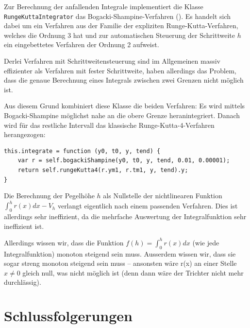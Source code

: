 \documentclass[11pt]{scrreprt} %
\theoremstyle{definition}
\begin{document}
Zur Berechnung der anfallenden Integrale implementiert die Klasse {\tt RungeKuttaIntegrator} das Bogacki-Shampine-Verfahren (\cite{wiki:bogackiShampine}). Es handelt sich dabei um ein Verfahren aus der Familie der expliziten Runge-Kutta-Verfahren, welches die Ordnung 3 hat und zur automatischen Steuerung der Schrittweite $h$ ein eingebettetes Verfahren der Ordnung 2 aufweist.

Derlei Verfahren mit Schrittweitensteuerung sind im Allgemeinen massiv effizienter als Verfahren mit fester Schrittweite, haben allerdings das Problem, dass die genaue Berechnung eines Integrals zwischen zwei Grenzen nicht möglich ist.

Aus diesem Grund kombiniert diese Klasse die beiden Verfahren: Es wird mittels Bogacki-Shampine möglichst nahe an die obere Grenze heranintegriert. Danach wird für das restliche Intervall das klassische Runge-Kutta-4-Verfahren herangezogen:

\begin{lstlisting}
this.integrate = function (y0, t0, y, tend) {
	var r = self.bogackiShampine(y0, t0, y, tend, 0.01, 0.00001);
	return self.rungeKutta4(r.ym1, r.tm1, y, tend).y;
}
\end{lstlisting}

Die Berechnung der Pegelhöhe $h$ als Nullstelle der nichtlinearen Funktion $\int_0^h r(x) dx - V_h$ verlangt eigentlich nach einem passenden Verfahren. Dies ist allerdings sehr ineffizient, da die mehrfache Auswertung der Integralfunktion sehr ineffizient ist.

Allerdings wissen wir, dass die Funktion  $f(h) = \int_0^h r(x) dx$ (wie jede Integralfunktion) monoton steigend sein muss. Ausserdem wissen wir, dass sie sogar streng monoton steigend sein muss -- ansonsten wäre r(x) an einer Stelle $x  \ne 0$ gleich null, was nicht möglich ist (denn dann wäre der Trichter nicht mehr durchlässig).

\chapter{Schlussfolgerungen}



\end{document}

